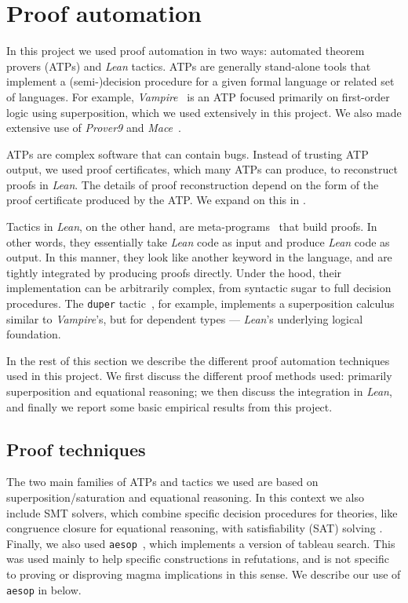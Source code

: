 \section{Proof automation}\label{automated-sec}

In this project we used proof automation in two ways: automated theorem provers (ATPs) and \emph{Lean} tactics.
ATPs are generally stand-alone tools that implement a (semi-)decision procedure for a given formal language or related set of languages.
For example, \emph{Vampire}~\cite{DBLP:conf/cav/KovacsV13} is an ATP focused primarily on first-order logic using superposition, which we used extensively in this project.  We also made extensive use of \emph{Prover9} and \emph{Mace}~\cite{prover9-mace4}.

ATPs are complex software that can contain bugs.
Instead of trusting ATP output, we used proof certificates, which many ATPs can produce, to reconstruct proofs in \emph{Lean}.
The details of proof reconstruction depend on the form of the proof certificate produced by the ATP.
We expand on this in .

Tactics in \emph{Lean}, on the other hand, are meta-programs~\cite{DBLP:journals/pacmpl/EbnerURAM17} that build proofs.
In other words, they essentially take \emph{Lean} code as input and produce \emph{Lean} code as output.
In this manner, they look like another keyword in the language, and are tightly integrated by producing proofs directly.
Under the hood, their implementation can be arbitrarily complex, from syntactic sugar to full decision procedures.
The \texttt{duper} tactic~\cite{DBLP:conf/itp/CluneQBA24}, for example, implements a superposition calculus similar to \emph{Vampire}'s, but for dependent types --- \emph{Lean}'s underlying logical foundation.

In the rest of this section we describe the different proof automation techniques used in this project.
We first discuss the different proof methods used: primarily superposition and equational reasoning; we then discuss the integration in \emph{Lean}, and finally we report some basic empirical results from this project.

\subsection{Proof techniques}

The two main families of ATPs and tactics we used are based on superposition/saturation and equational reasoning.
In this context we also include SMT solvers, which combine specific decision procedures for theories, like congruence closure for equational reasoning, with satisfiability (SAT) solving \cite{deMoura-Bjorner-2009}.
Finally, we also used \texttt{aesop}~\cite{DBLP:conf/cpp/LimpergF23}, which implements a version of tableau search.
This was used mainly to help specific constructions in refutations, and is not specific to proving or disproving magma implications in this sense.
We describe our use of \texttt{aesop} in  below.

